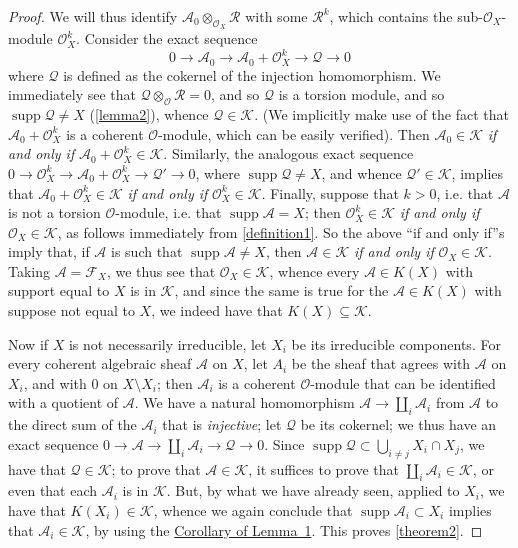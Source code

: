 \documentclass{article}
\theoremstyle{plain}
\theoremstyle{definition}
\newcommand{\sh}[1]{{\mathscr{#1}}}
\newcommand{\cat}[1]{{\mathcal{#1}}}
\newcommand{\supp}{\operatorname{supp}}
\newcommand{\oldpage}[1]{\marginpar{\footnotesize$\Big\vert$ \textit{p.~#1}}}
\begin{document}
\begin{proof}
  We will thus identify $\sh{A}_0\otimes_{\sh{O}_X}\sh{R}$ with some $\sh{R}^k$, which contains the sub-$\sh{O}_X$-module $\sh{O}_X^k$.
  Consider the exact sequence
  \[
    0 \to \sh{A}_0 \to \sh{A}_0+\sh{O}_X^k \to \sh{Q} \to 0
  \]
  where $\sh{Q}$ is defined as the cokernel of the injection homomorphism.
  We immediately see that $\sh{Q}\otimes_{\sh{O}}\sh{R}=0$, and so $\sh{Q}$ is a torsion module, and so $\supp\sh{Q}\neq X$ (\cref{lemma2}), whence $\sh{Q}\in\cat{K}$.
  (We implicitly make use of the fact that $\sh{A}_0+\sh{O}_X^k$ is a coherent $\sh{O}$-module, which can be easily verified).
  Then $\sh{A}_0\in\cat{K}$ \emph{if and only if} $\sh{A}_0+\sh{O}_X^k\in\cat{K}$.
  Similarly, the analogous exact sequence
  \oldpage{2-04}
  $0\to\sh{O}_X^k\to\sh{A}_0+\sh{O}_X^k\to\sh{Q}'\to0$, where $\supp\sh{Q}\neq X$, and whence $\sh{Q}'\in\cat{K}$, implies that $\sh{A}_0+\sh{O}_X^k\in\cat{K}$ \emph{if and only if} $\sh{O}_X^k\in\cat{K}$.
  Finally, suppose that $k>0$, i.e. that $\sh{A}$ is not a torsion $\sh{O}$-module, i.e. that $\supp\sh{A}=X$;
  then $\sh{O}_X^k\in\cat{K}$ \emph{if and only if} $\sh{O}_X\in\cat{K}$, as follows immediately from \cref{definition1}.
  So the above ``if and only if''s imply that, if $\sh{A}$ is such that $\supp\sh{A}\neq X$, then $\sh{A}\in\cat{K}$ \emph{if and only if} $\sh{O}_X\in\cat{K}$.
  Taking $\sh{A}=\sh{F}_X$, we thus see that $\sh{O}_X\in\cat{K}$, whence every $\sh{A}\in K(X)$ with support equal to $X$ is in $\cat{K}$, and since the same is true for the $\sh{A}\in K(X)$ with suppose not equal to $X$, we indeed have that $K(X)\subseteq\cat{K}$.

  Now if $X$ is not necessarily irreducible, let $X_i$ be its irreducible components.
  For every coherent algebraic sheaf $\sh{A}$ on $X$, let $A_i$ be the sheaf that agrees with $\sh{A}$ on $X_i$, and with $0$ on $X\setminus X_i$;
  then $\sh{A}_i$ is a coherent $\sh{O}$-module that can be identified with a quotient of $\sh{A}$.
  We have a natural homomorphism $\sh{A}\to\coprod_i\sh{A}_i$ from $\sh{A}$ to the direct sum of the $\sh{A}_i$ that is \emph{injective};
  let $\sh{Q}$ be its cokernel;
  we thus have an exact sequence $0\to\sh{A}\to\coprod_i\sh{A}_i\to\sh{Q}\to0$.
  Since $\supp\sh{Q}\subset\bigcup_{i\neq j}X_i\cap X_j$, we have that $\sh{Q}\in\cat{K}$;
  to prove that $\sh{A}\in\cat{K}$, it suffices to prove that $\coprod_i\sh{A}_i\in\cat{K}$, or even that each $\sh{A}_i$ is in $\cat{K}$.
  But, by what we have already seen, applied to $X_i$, we have that $K(X_i)\in\cat{K}$, whence we again conclude that $\supp\sh{A}_i\subset X_i$ implies that $\sh{A}_i\in\cat{K}$, by using the \hyperref[corollary-1]{Corollary of Lemma~1}.
  This proves \cref{theorem2}.
\end{proof}
\end{document}
